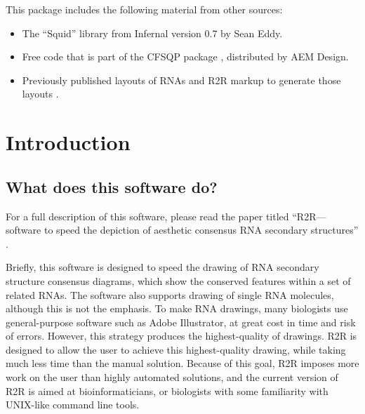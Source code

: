 \documentclass[letterpaper,12pt]{report}
\begin{document}
\begin{titlepage}
This package includes the following material from other sources:
\begin{itemize}
\item The ``Squid'' library from Infernal version 0.7 by Sean Eddy.
\item Free code that is part of the CFSQP package \cite{CFSQP}, distributed by AEM Design.
\item Previously published layouts of RNAs and R2R markup to generate those layouts \cite{Weinberg22Motifs,Weinberg104Motifs,CoolRNAs,SAMIV,SAH,RegulskiMoco,SudarsanGEMM,GEMMII}.
\end{itemize}
\end{titlepage}

\clearpage\setcounter{page}{1}


\setcounter{tocdepth}{3}
\renewcommand\contentsname{}
\tableofcontents

\chapter{Introduction}

\section{What does this software do?}

\newcommand{\researchpapertitle}[0]{R2R---software to speed the depiction of aesthetic consensus RNA secondary structures}

For a full description of this software, please read the paper titled ``\researchpapertitle{}'' \cite{RtoR}.

Briefly, this software is designed to speed the drawing of RNA secondary structure consensus diagrams, which show the conserved
features within a set of related RNAs. The software also supports drawing of single RNA molecules, although this is not the emphasis.
To make RNA drawings, many biologists use general-purpose software such as Adobe Illustrator, at great cost in time
and risk of errors.
However, this strategy produces the highest-quality of drawings.
R2R is designed to allow the user to achieve this highest-quality drawing, while taking much less time than the manual solution.
Because of this goal, R2R imposes more work on the user than highly automated solutions, and 
the current version of R2R is aimed at bioinformaticians, or biologists with some familiarity with UNIX-like command line tools.
\end{document}
